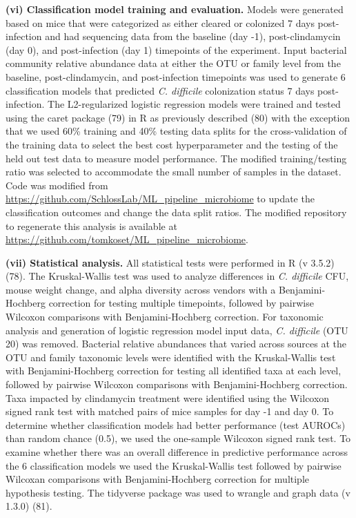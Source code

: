 \documentclass[11pt,]{article}
\begin{document}
\textbf{(vi) Classification model training and evaluation.} Models were
generated based on mice that were categorized as either cleared or
colonized 7 days post-infection and had sequencing data from the
baseline (day -1), post-clindamycin (day 0), and post-infection (day 1)
timepoints of the experiment. Input bacterial community relative
abundance data at either the OTU or family level from the baseline,
post-clindamycin, and post-infection timepoints was used to generate 6
classification models that predicted \emph{C. difficile} colonization
status 7 days post-infection. The L2-regularized logistic regression
models were trained and tested using the caret package (79) in R as
previously described (80) with the exception that we used 60\% training
and 40\% testing data splits for the cross-validation of the training
data to select the best cost hyperparameter and the testing of the held
out test data to measure model performance. The modified
training/testing ratio was selected to accommodate the small number of
samples in the dataset. Code was modified from
\url{https://github.com/SchlossLab/ML_pipeline_microbiome} to update the
classification outcomes and change the data split ratios. The modified
repository to regenerate this analysis is available at
\url{https://github.com/tomkoset/ML_pipeline_microbiome}.

\textbf{(vii) Statistical analysis.} All statistical tests were
performed in R (v 3.5.2) (78). The Kruskal-Wallis test was used to
analyze differences in \emph{C. difficile} CFU, mouse weight change, and
alpha diversity across vendors with a Benjamini-Hochberg correction for
testing multiple timepoints, followed by pairwise Wilcoxon comparisons
with Benjamini-Hochberg correction. For taxonomic analysis and
generation of logistic regression model input data, \emph{C. difficile}
(OTU 20) was removed. Bacterial relative abundances that varied across
sources at the OTU and family taxonomic levels were identified with the
Kruskal-Wallis test with Benjamini-Hochberg correction for testing all
identified taxa at each level, followed by pairwise Wilcoxon comparisons
with Benjamini-Hochberg correction. Taxa impacted by clindamycin
treatment were identified using the Wilcoxon signed rank test with
matched pairs of mice samples for day -1 and day 0. To determine whether
classification models had better performance (test AUROCs) than random
chance (0.5), we used the one-sample Wilcoxon signed rank test. To
examine whether there was an overall difference in predictive
performance across the 6 classification models we used the
Kruskal-Wallis test followed by pairwise Wilcoxan comparisons with
Benjamini-Hochberg correction for multiple hypothesis testing. The
tidyverse package was used to wrangle and graph data (v 1.3.0) (81).
\end{document}
